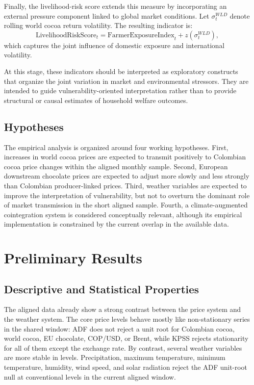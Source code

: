 \documentclass[11pt]{article}
\begin{document}
Finally, the livelihood-risk score extends this measure by incorporating an external pressure component linked to global market conditions. Let $\sigma^{WLD}_t$ denote rolling world cocoa return volatility. The resulting indicator is:
\begin{equation}
\mathrm{LivelihoodRiskScore}_t = \mathrm{FarmerExposureIndex}_t + z(\sigma^{WLD}_t),
\label{eq:livelihood_risk}
\end{equation}
which captures the joint influence of domestic exposure and international volatility.

At this stage, these indicators should be interpreted as exploratory constructs that organize the joint variation in market and environmental stressors. They are intended to guide vulnerability-oriented interpretation rather than to provide structural or causal estimates of household welfare outcomes.

\subsection{Hypotheses}

The empirical analysis is organized around four working hypotheses. First, increases in world cocoa prices are expected to transmit positively to Colombian cocoa price changes within the aligned monthly sample. Second, European downstream chocolate prices are expected to adjust more slowly and less strongly than Colombian producer-linked prices. Third, weather variables are expected to improve the interpretation of vulnerability, but not to overturn the dominant role of market transmission in the short aligned sample. Fourth, a climate-augmented cointegration system is considered conceptually relevant, although its empirical implementation is constrained by the current overlap in the available data.
\section{Preliminary Results}
\label{sec:results}

\subsection{Descriptive and Statistical Properties}

The aligned data already show a strong contrast between the price system and the weather system. The core price levels behave mostly like non-stationary series in the shared window: ADF does not reject a unit root for Colombian cocoa, world cocoa, EU chocolate, COP/USD, or Brent, while KPSS rejects stationarity for all of them except the exchange rate. By contrast, several weather variables are more stable in levels. Precipitation, maximum temperature, minimum temperature, humidity, wind speed, and solar radiation reject the ADF unit-root null at conventional levels in the current aligned window.
\end{document}
